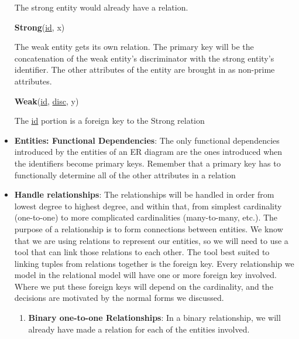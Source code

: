 \documentclass{report}
\begin{document}
\begin{itemize}
            \bigbreak \noindent 
            \bigbreak \noindent 
            The strong entity would already have a relation. 
            \begin{center}
                \textbf{Strong}(\underline{id}, x)
            \end{center}
            \bigbreak \noindent 
            The weak entity gets its own relation. The primary key will be the concatenation of the weak entity’s discriminator with the strong entity’s identifier. The other attributes of the entity are brought in as non-prime attributes.
            \begin{center}
                \textbf{Weak}(\underline{id}\dag, \underline{disc}, y)
            \end{center}
            \bigbreak \noindent 
            The \underline{id} portion is a foreign key to the Strong relation
        \item \textbf{Entities: Functional Dependencies}: The only functional dependencies introduced by the entities of an ER diagram are the ones introduced when the identifiers become primary keys. Remember that a primary key has to functionally determine all of the other attributes in a relation
        \item \textbf{Handle relationships}: The relationships will be handled in order from lowest degree to highest degree, and within that, from simplest cardinality (one-to-one) to more complicated cardinalities (many-to-many, etc.).
            \bigbreak \noindent 
            The purpose of a relationship is to form connections between entities. We know that we are using relations to represent our entities, so we will need to use a tool that can link those relations to each other.
            \bigbreak \noindent 
            The tool best suited to linking tuples from relations together is the foreign key.
            \bigbreak \noindent 
            Every relationship we model in the relational model will have one or more foreign key involved. Where we put these foreign keys will depend on the cardinality, and the decisions are motivated by the normal forms we discussed.
            \begin{enumerate}
                \item \textbf{Binary one-to-one Relationships}: In a binary relationship, we will already have made a relation for each of the entities involved.
                    \bigbreak \noindent 
                    \begin{center}

\end{center}
\end{enumerate}
\end{itemize}
\end{document}
